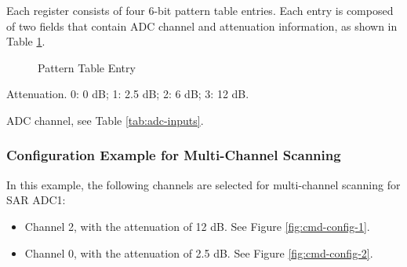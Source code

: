 \documentclass[main\_\_EN.tex]{subfiles}
\begin{document}
Each register consists of four 6-bit pattern table entries. Each entry is composed of two fields that contain ADC channel and attenuation information, as shown in Table \ref{tab:pattern-table-register}.


\begin{figure}[H]
\centering
{}%
%
\end{figure}
\vspace{-2em}
\begin{figure}[H]
    \centering
    \caption{Pattern Table Entry}
    \label{tab:pattern-table-register}
\end{figure}
\vspace{-2em}
\begin{regdesc}\begin{reglist}
\item [atten] Attenuation. 0: 0 dB; 1: 2.5 dB; 2: 6 dB; 3: 12 dB.
\item [ch\_sel] ADC channel, see Table \ref{tab:adc-inputs}.
\end{reglist}\end{regdesc}

\subsubsection{Configuration Example for Multi-Channel Scanning}

In this example, the following channels are selected for multi-channel scanning for SAR ADC1:
\begin{itemize}
    \item Channel 2, with the attenuation of 12 dB. See Figure \ref{fig:cmd-config-1}.
    \item Channel 0, with the attenuation of 2.5 dB. See Figure \ref{fig:cmd-config-2}.
\end{itemize}
\end{document}
